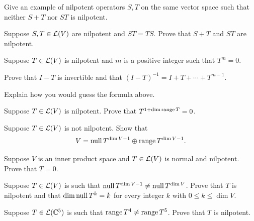 \begin{exc}
\begin{exercise}\leavevmode
\begin{parts}
\item Give an example of nilpotent operators $S,T$ on the same vector space
  such that neither $S+T$ nor $ST$ is nilpotent.
\item Suppose $S,T\in\mathcal{L}(V)$ are nilpotent and $ST=TS$. Prove that $S+T$ and
  $ST$ are nilpotent.
\end{parts}
\end{exercise}

\begin{exercise}
Suppose $T\in\mathcal{L}(V)$ is nilpotent and $m$ is a positive integer such that
$T^m=0$.
\begin{parts}
\item Prove that $I-T$ is invertible and that
  $(I-T)^{-1}=I+T+\cdots+T^{m-1}$.
\item Explain how you would guess the formula above.
\end{parts}
\end{exercise}

\begin{exercise}
Suppose $T\in\mathcal{L}(V)$ is nilpotent. Prove that $T^{1+\operatorname{dim}\operatorname{range} T}=0$.
\end{exercise}

\begin{exercise}
Suppose $T\in\mathcal{L}(V)$ is not nilpotent. Show that
\[ V = \operatorname{null} T^{\operatorname{dim} V-1}\oplus\operatorname{range} T^{\operatorname{dim} V-1}. \]
\end{exercise}

\begin{exercise}
Suppose $V$ is an inner product space and $T\in\mathcal{L}(V)$ is normal and
nilpotent. Prove that $T=0$.
\end{exercise}

\begin{exercise}
Suppose $T\in\mathcal{L}(V)$ is such that $\operatorname{null} T^{\operatorname{dim} V-1}\ne\operatorname{null} T^{\operatorname{dim} V}$.
Prove that $T$ is nilpotent and that $\operatorname{dim}\operatorname{null} T^k=k$ for every integer $k$
with $0\le k\le\dim V$.
\end{exercise}

\begin{exercise}
Suppose $T\in\mathcal{L}(\mathbb{C}^5)$ is such that $\operatorname{range} T^4\ne\operatorname{range} T^5$. Prove that $T$
is nilpotent.
\end{exercise}


\end{exc}
